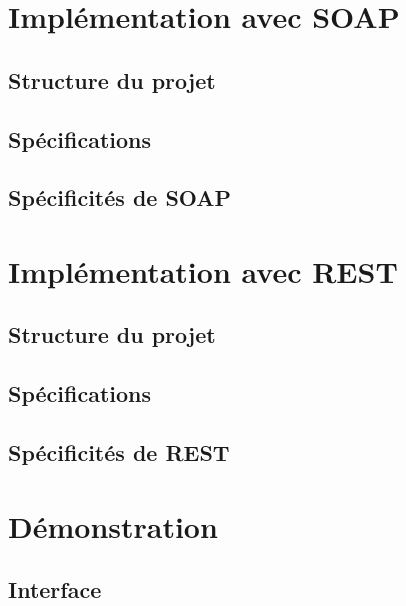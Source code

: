 \documentclass{article}
\begin{document}
	\newpage
	\section{Implémentation avec SOAP}
	\subsection{Structure du projet}
	\subsection{Spécifications}
	\subsection{Spécificités de SOAP}
	

	\section{Implémentation avec REST}
	\subsection{Structure du projet}
	\subsection{Spécifications}
	\subsection{Spécificités de REST}
	
	\section{Démonstration}
	\subsection{Interface}
\end{document}
